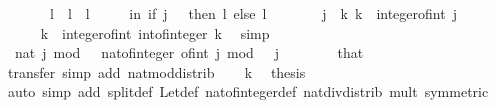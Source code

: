 \begin{isabellebody}
\ \ \ \ \ \ \ l{\isacharprime}{\kern0pt}{\isacharprime}{\kern0pt}\ {\isacharequal}{\kern0pt}\ l{\isacharprime}{\kern0pt}\ {\isacharplus}{\kern0pt}\ l{\isacharprime}{\kern0pt}\isanewline
\ \ \ \ \ in\ if\ j\ {\isacharequal}{\kern0pt}\ {}\ then\ l{\isacharprime}{\kern0pt}{\isacharprime}{\kern0pt}\ else\ l{\isacharprime}{\kern0pt}{\isacharprime}{\kern0pt}\ {\isacharplus}{\kern0pt}\ {}{\isacharparenright}{\kern0pt}{\isachardoublequoteclose}\isanewline
%
\isadelimproof
%
\endisadelimproof
%
\isatagproof
{}\isamarkupfalse%
\ {\isacharminus}{\kern0pt}\isanewline
\ \ \isamarkupfalse%
\ j\ \ k{\isacharcolon}{\kern0pt}\ {\isachardoublequoteopen}k\ {\isacharequal}{\kern0pt}\ integer{\isacharunderscore}{\kern0pt}of{\isacharunderscore}{\kern0pt}int\ j{\isachardoublequoteclose}\isanewline
\ \ \isamarkupfalse%
\isanewline
\ \ \ \ \isamarkupfalse%
\ {\isachardoublequoteopen}k\ {\isacharequal}{\kern0pt}\ integer{\isacharunderscore}{\kern0pt}of{\isacharunderscore}{\kern0pt}int\ {\isacharparenleft}{\kern0pt}int{\isacharunderscore}{\kern0pt}of{\isacharunderscore}{\kern0pt}integer\ k{\isacharparenright}{\kern0pt}{\isachardoublequoteclose}\ \isamarkupfalse%
\ simp\isanewline
\ \ \isamarkupfalse%
\isanewline
\ \ \isamarkupfalse%
\ {\isacharasterisk}{\kern0pt}{\isacharcolon}{\kern0pt}\ {\isachardoublequoteopen}nat\ j\ mod\ {}\ {\isacharequal}{\kern0pt}\ nat{\isacharunderscore}{\kern0pt}of{\isacharunderscore}{\kern0pt}integer\ {\isacharparenleft}{\kern0pt}of{\isacharunderscore}{\kern0pt}int\ j\ mod\ {}{\isacharparenright}{\kern0pt}{\isachardoublequoteclose}\ \ {\isachardoublequoteopen}j\ {\isasymge}\ {}{\isachardoublequoteclose}\isanewline
\ \ \ \ \isamarkupfalse%
\ that\ \isamarkupfalse%
\ transfer\ {\isacharparenleft}{\kern0pt}simp\ add{\isacharcolon}{\kern0pt}\ nat{\isacharunderscore}{\kern0pt}mod{\isacharunderscore}{\kern0pt}distrib{\isacharparenright}{\kern0pt}\isanewline
\ \ \isamarkupfalse%
\ k\ \isamarkupfalse%
\ {\isacharquery}{\kern0pt}thesis\isanewline
\ \ \ \ \isamarkupfalse%
\ {\isacharparenleft}{\kern0pt}auto\ simp\ add{\isacharcolon}{\kern0pt}\ split{\isacharunderscore}{\kern0pt}def\ Let{\isacharunderscore}{\kern0pt}def\ nat{\isacharunderscore}{\kern0pt}of{\isacharunderscore}{\kern0pt}integer{\isacharunderscore}{\kern0pt}def\ nat{\isacharunderscore}{\kern0pt}div{\isacharunderscore}{\kern0pt}distrib\ mult{\isacharunderscore}{\kern0pt}{}\ {\isacharbrackleft}{\kern0pt}symmetric{\isacharbrackright}{\kern0pt}\isanewline

\end{isabellebody}

